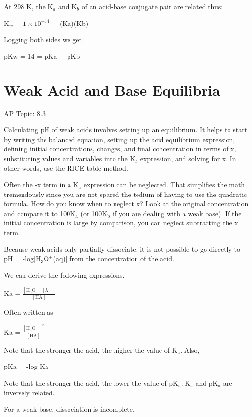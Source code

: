 \documentclass[../chem.tex]{subfiles}
\begin{document}
At 298 K, the K$_a$ and K$_b$ of an acid-base conjugate pair are related thus:
\begin{center}
    K$_w$ = $1\times 10^{-14}$ = (Ka)(Kb)
\end{center}

Logging both sides we get 
\begin{center}
    pKw = 14 = pKa + pKb
\end{center}
\section{Weak Acid and Base Equilibria}
AP Topic: 8.3

Calculating pH of weak acids involves setting up an equilibrium. It helps to start by writing the balanced equation, setting up the acid equilibrium expression, 
defining initial concentrations, changes, and final concentration in terms of x, substituting values and variables into the K$_\text{a}$ expression, and solving for x. In other words,
use the RICE table method.

Often the -x term in a K$_\text{a}$ expression can be neglected. That simplifies the math tremendously since you are not spared the tedium of having to use the 
quadratic formula. How do you know when to neglect x? Look at the original concentration and compare it to 100K$_\text{a}$ (or 100K$_{\text{b}}$ if you are dealing with a weak base). 
If the initial concentration is large by comparison, you can neglect subtracting the x term.

Because weak acids only partially dissociate, it is not possible to go directly to pH = -log[H$_3$O$^+$(aq)] from the concentration of the acid.

We can derive the following expressions.
\begin{center}
    Ka = $\frac{[\text{H}_3\text{O}^+][\text{A}^-]}{[\text{HA}]}$
\end{center}
Often written as
\begin{center}
    Ka = $\frac{[\text{H}_3\text{O}^+]^2}{[\text{HA}]}$
\end{center}

Note that the stronger the acid, the higher the value of K$_{\text{a}}$. Also,
\begin{center}
    pKa = -log Ka 
\end{center}
Note that the stronger the acid, the lower the value of pK$_{\text{a}}$. K$_{\text{a}}$ and pK$_{\text{a}}$ are inversely related.

For a weak base, dissociation is incomplete.
\end{document}

